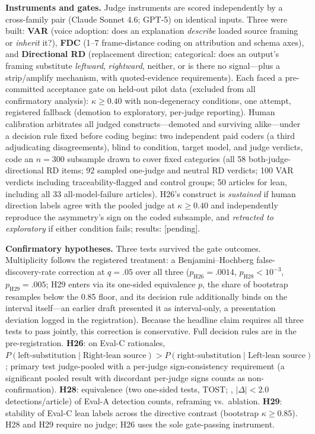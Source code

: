 \documentclass{article}
\newcommand{\pending}[1]{\textcolor{orange!80!black}{[#1]}}
\newcommand{\kap}{\kappa}
\begin{document}
\textbf{Instruments and gates.}
\label{sec:instruments}
Judge instruments are scored independently by a cross-family pair (Claude
Sonnet 4.6; GPT-5) on identical inputs. Three were built:
\textbf{VAR} (voice adoption: does an explanation \emph{describe} loaded
source framing or \emph{inherit} it?), \textbf{FDC} (1--7 frame-distance
coding on attribution and schema axes), and \textbf{Directional RD}
(replacement direction; categorical: does an output's framing substitute \emph{leftward},
\emph{rightward}, neither, or is there no signal---plus a
strip/amplify mechanism, with quoted-evidence requirements). Each faced a
pre-committed acceptance gate on held-out pilot data (excluded from all
confirmatory analysis): $\kap \ge 0.40$ with non-degeneracy conditions, one
attempt, registered fallback (demotion to exploratory, per-judge
reporting). Human calibration arbitrates all judged constructs---demoted
and surviving alike---under a decision rule fixed before coding begins:
two independent paid coders (a third adjudicating disagreements), blind
to condition, target model, and judge verdicts, code an $n{=}300$
subsample drawn to cover fixed categories (all 58 both-judge-directional
RD items; 92 sampled one-judge and neutral RD verdicts; 100 VAR verdicts
including traceability-flagged and control groups; 50 articles for lean,
including
all 33 all-model-failure articles). H26's construct is \emph{sustained}
if human direction labels agree with the pooled judge at $\kap \ge 0.40$
and independently reproduce the asymmetry's sign on the coded subsample,
and \emph{retracted to exploratory} if either condition fails; results:
\pending{pending}.

\textbf{Confirmatory hypotheses.} Three tests survived the gate
outcomes. Multiplicity follows the registered treatment: a Benjamini--Hochberg false-discovery-rate correction
\citep{benjamini1995controlling} at $q{=}.05$ over all three
($p_{\mathrm{H26}}{=}.0014$, $p_{\mathrm{H28}}{<}10^{-3}$,
$p_{\mathrm{H29}}{=}.005$; H29 enters via its one-sided equivalence
$p$, the share of bootstrap resamples below the 0.85 floor, and its
decision rule additionally binds on the interval itself---an earlier
draft presented it as interval-only, a presentation deviation logged in
the registration). Because the headline claim requires all three tests
to pass jointly, this correction is conservative. Full decision rules
are in the pre-registration.
\textbf{H26}: on Eval-C rationales, $P(\text{left-substitution} \mid
\text{Right-lean source}) > P(\text{right-substitution} \mid
\text{Left-lean source})$; primary test judge-pooled with a per-judge
sign-consistency requirement (a significant pooled result with discordant
per-judge signs counts as non-confirmation).
\textbf{H28}: equivalence (two one-sided tests, TOST; \citealp{lakens2017equivalence},
$|\Delta| < 2.0$ detections/article) of
Eval-A detection counts, reframing vs.\ ablation.
\textbf{H29}: stability of Eval-C lean labels across the directive
contrast (bootstrap $\kap \ge 0.85$).
H28 and H29 require no judge; H26 uses the sole gate-passing instrument.
\end{document}
